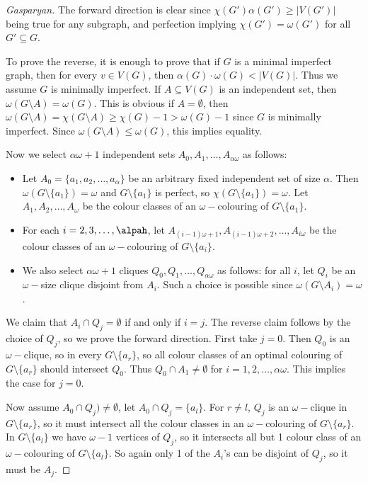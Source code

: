\documentclass[12pt, a4paper]{book}
\theoremstyle{nonumberplain}
\newtheorem{proof}{Proof}
\begin{document}
\begin{proof}[Gasparyan]
    The forward direction is clear since $\chi(G')\alpha(G')\geq|V(G')|$ being true for any subgraph, and perfection implying $\chi(G')=\omega(G')$ for all $G'\subseteq G$.

    To prove the reverse, it is enough to prove that if $G$ is a minimal imperfect graph, then for every $v\in V(G)$, then $\alpha(G)\cdot\omega(G)<|V(G)|$.
    Thus we assume $G$ is minimally imperfect.
    If $A\subseteq V(G)$ is an independent set, then $\omega(G\setminus A)=\omega(G)$.
    This is obvious if $A=\emptyset$, then $\omega(G\setminus A)=\chi(G\setminus A)\geq\chi(G)-1>\omega(G)-1$ since $G$ is minimally imperfect.
    Since $\omega(G\setminus A)\leq\omega(G)$, this implies equality.

    Now we select $\alpha\omega+1$ independent sets $A_0,A_1,\ldots,A_{\alpha\omega}$ as follows:
    \begin{itemize}[nolistsep]
        \item Let $A_0=\{a_1,a_2,\ldots,a_{\alpha}\}$ be an arbitrary fixed independent set of size $\alpha$.
            Then $\omega(G\setminus\{a_1\})=\omega$ and $G\setminus\{a_1\}$ is perfect, so $\chi(G\setminus\{a_1\})=\omega$.
            Let $A_1,A_2,\ldots,A_\omega$ be the colour classes of an $\omega-$colouring of $G\setminus\{a_1\}$.
        \item For each $i=2,3,\ldots,\alpah$, let $A_{(i-1)\omega+1},A_{(i-1)\omega+2},\ldots,A_{i\omega}$ be the colour classes of an $\omega-$colouring of $G\setminus\{a_i\}$.
        \item We also select $\alpha\omega+1$ cliques $Q_0,Q_1,\ldots,Q_{\alpha\omega}$ as follows: for all $i$, let $Q_i$ be an $\omega-$size clique disjoint from $A_i$.
            Such a choice is possible since $\omega(G\setminus A_i)=\omega$.
    \end{itemize}
    We claim that $A_i\cap Q_j=\emptyset$ if and only if $i=j$.
    The reverse claim follows by the choice of $Q_j$, so we prove the forward direction.
    First take $j=0$.
    Then $Q_0$ is an $\omega-$clique, so in every $G\setminus\{a_r\}$, so all colour classes of an optimal colouring of $G\setminus\{a_r\}$ should intersect $Q_0$.
    Thus $Q_0\cap A_1\neq\emptyset$ for $i=1,2,\ldots,\alpha\omega$.
    This implies the case for $j=0$.

    Now assume $A_0\cap Q_j)\neq\emptyset$, let $A_0\cap Q_j=\{a_l\}$.
    For $r\neq l$, $Q_j$ is an $\omega-$clique in $G\setminus\{a_r\}$, so it must intersect all the colour classes in an $\omega-$colouring of $G\setminus\{a_r\}$.
    In $G\setminus\{a_l\}$ we have $\omega-1$ vertices of $Q_j$, so it intersects all but 1 colour class of an $\omega-$colouring of $G\setminus\{a_l\}$.
    So again only 1 of the $A_i$'s can be disjoint of $Q_j$, so it must be $A_j$.


\end{proof}
\end{document}
